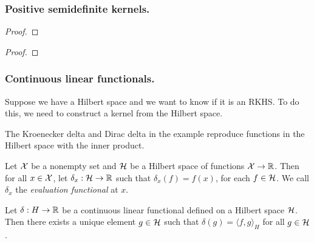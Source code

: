 

\subsubsection{Positive semidefinite kernels.}

\begin{theorem}
    \label{thm:moore-aronszajn}
    \cite{aronszajn1950theory}
    
\end{theorem}
\begin{proof}
    
\end{proof}

\begin{theorem}
    \label{thm:rk-uniqueness}
    \cite{aronszajn1950theory}
    
\end{theorem}
\begin{proof}
    
\end{proof}

\subsubsection{Continuous linear functionals.}

Suppose we have a Hilbert space and we want to know if it is an RKHS.
To do this, we need to construct a kernel from the Hilbert space.

\begin{example}
    \label{eg:r4-rkhs}
    
\end{example}

The Kroenecker delta and Dirac delta in the example reproduce functions in the Hilbert space with the inner product.

\begin{definition}
    \label{def:eval-functional}
    Let \(\mathcal{X}\) be a nonempty set and \(\mathcal{H}\) be a Hilbert space of functions \(\mathcal{X} \to \mathbb{R}\).
    Then for all \(x \in \mathcal{X}\), let \(\delta_x : \mathcal{H} \to \mathbb{R}\) such that \(\delta_x(f) = f(x)\), for each \(f \in \mathcal{H}\).
    We call \(\delta_x\) the \textit{evaluation functional} at \(x\).
\end{definition}

\begin{theorem}
    \cite{small1994hilbert} %
    Let \(\delta : H \to \mathbb{R}\) be a continuous linear functional defined on a Hilbert space \(\mathcal{H}\).
    Then there exists a unique element \(g \in \mathcal{H}\) such that \(\delta(g) = \langle f, g \rangle_H\) for all \(g \in \mathcal{H}\).
\end{theorem}

